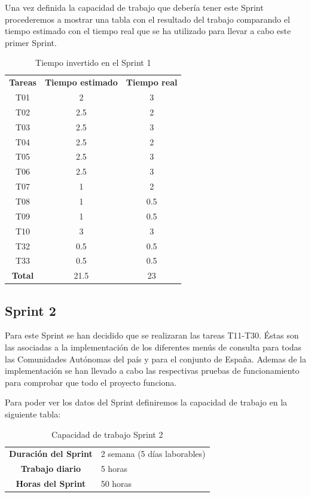 Una vez definida la capacidad de trabajo que debería tener este Sprint procederemos a mostrar una tabla con el resultado del trabajo comparando el tiempo estimado con el tiempo real que se ha utilizado para llevar a cabo este primer Sprint.

\begin{table}[H]
	\begin{center}
		\begin{tabular}{| c | c | c |}
			\hline
			
			\textbf{Tareas} & \textbf{Tiempo estimado} & \textbf{Tiempo real} \\
			T01 & 2 & 3 \\
			T02 & 2.5 & 2 \\
			T03 & 2.5 & 3 \\
			T04 & 2.5 & 2 \\
			T05 & 2.5 & 3 \\
			T06 & 2.5 & 3 \\
			T07 & 1 & 2 \\
			T08 & 1 & 0.5 \\
			T09 & 1 & 0.5 \\
			T10 & 3 & 3 \\		
			T32 & 0.5 & 0.5 \\
			T33 & 0.5 & 0.5 \\
			\textbf{Total} & 21.5 & 23 \\ \hline
		\end{tabular}
		\caption{Tiempo invertido en el Sprint 1}
	\end{center}
\end{table} 

\subsection{Sprint 2}

Para este Sprint se han decidido que se realizaran las tareas T11-T30. Éstas son las asociadas a la implementación de los diferentes menús de consulta para todas las Comunidades Autónomas del país y para el conjunto de España. Ademas de la implementación se han llevado a cabo las respectivas pruebas de funcionamiento para comprobar que todo el proyecto funciona.

Para poder ver los datos del Sprint definiremos la capacidad de trabajo en la siguiente tabla:

\begin{table}[H]
	\begin{center}
		\begin{tabular}{| c | p{9cm} |}
			\hline
			
			\textbf{Duración del Sprint} & 2 semana (5 días laborables) \\
			\textbf{Trabajo diario} & 5 horas \\
			\textbf{Horas del Sprint} & 50 horas \\ \hline
		\end{tabular}
		\caption{Capacidad de trabajo Sprint 2}
	\end{center}
\end{table}

